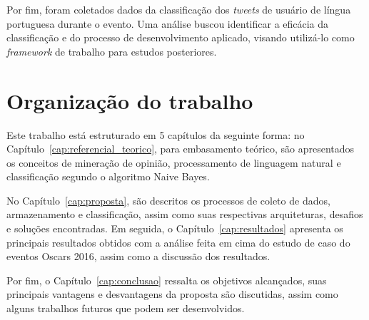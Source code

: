 Por fim, foram coletados dados da classificação dos \textit{tweets} de usuário de língua portuguesa durante o evento. Uma análise buscou identificar a eficácia da classificação e do processo de desenvolvimento aplicado, visando utilizá-lo como \textit{framework} de trabalho para estudos posteriores.


\section{Organização do trabalho}

Este trabalho está estruturado em 5 capítulos da seguinte forma: no Capítulo~\ref{cap:referencial_teorico}, para embasamento teórico, são apresentados os conceitos de mineração de opinião, processamento de linguagem natural e classificação segundo o algoritmo Naive Bayes. 

No Capítulo~\ref{cap:proposta}, são descritos os processos de coleto de dados, armazenamento e classificação, assim como suas respectivas arquiteturas, desafios e soluções encontradas. Em seguida, o Capítulo~\ref{cap:resultados} apresenta os principais resultados obtidos com a análise feita em cima do estudo de caso do eventos Oscars 2016, assim como a discussão dos resultados. 

Por fim, o Capítulo~\ref{cap:conclusao} ressalta os objetivos alcançados, suas principais vantagens e desvantagens da proposta são discutidas, assim como alguns trabalhos futuros que podem ser desenvolvidos. 
